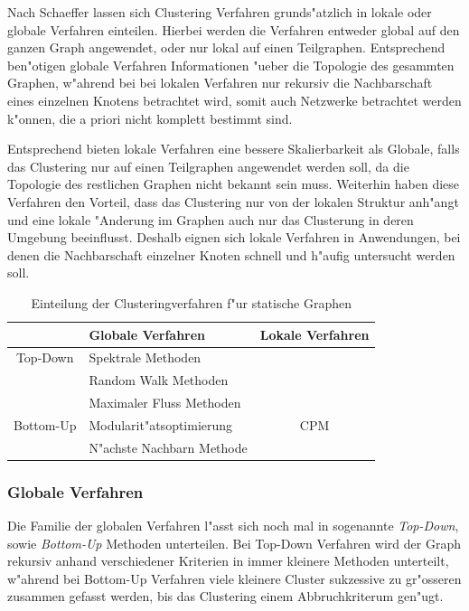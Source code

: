 \documentclass[journal]{vgtc}
\begin{document}
  Nach Schaeffer \cite{Schaeffer} lassen sich Clustering Verfahren grunds"atzlich in lokale oder globale
  Verfahren einteilen. Hierbei werden die Verfahren entweder global auf den ganzen Graph angewendet,
  oder nur lokal auf einen Teilgraphen. Entsprechend ben"otigen globale Verfahren Informationen "ueber 
  die Topologie des gesammten Graphen, w"ahrend bei bei lokalen Verfahren nur rekursiv die Nachbarschaft
  eines einzelnen Knotens betrachtet wird, somit auch Netzwerke betrachtet werden k"onnen, die a priori
  nicht komplett bestimmt sind.
  
  Entsprechend bieten lokale Verfahren eine bessere Skalierbarkeit als Globale, falls das Clustering nur
  auf einen Teilgraphen angewendet werden soll, da die Topologie des restlichen Graphen nicht bekannt sein muss.
  Weiterhin haben diese Verfahren den Vorteil, dass das Clustering nur von der lokalen Struktur anh"angt und eine
  lokale "Anderung im Graphen auch nur das Clusterung in deren Umgebung beeinflusst. Deshalb eignen sich lokale
  Verfahren in Anwendungen, bei denen die Nachbarschaft einzelner Knoten schnell und h"aufig untersucht werden soll.
  
  
    \begin{table}[h]
    \caption{\label{tab:static_methods} Einteilung der Clusteringverfahren f"ur statische Graphen}
    \scriptsize
    \begin{center}
      \begin{tabular}{c|l|c}
	& Globale Verfahren & Lokale Verfahren\\
	\hline
	Top-Down  & Spektrale Methoden       & \\
	          & Random Walk Methoden     & \\
	          & Maximaler Fluss Methoden & \\
	\hline
	Bottom-Up & Modularit"atsoptimierung & CPM \\
	          & N"achste Nachbarn Methode & 
      \end{tabular}
    \end{center}
  \end{table}
  
  \subsubsection*{Globale Verfahren}
  Die Familie der globalen Verfahren l"asst sich noch mal in sogenannte \emph{Top-Down}, sowie
  \emph{Bottom-Up} Methoden \cite{Schaeffer} unterteilen. Bei Top-Down Verfahren wird der Graph rekursiv anhand
  verschiedener Kriterien in immer kleinere Methoden unterteilt, w"ahrend bei Bottom-Up Verfahren
  viele kleinere Cluster sukzessive zu gr"osseren zusammen gefasst werden, bis das Clustering einem
  Abbruchkriterum gen"ugt.
  
\end{document}
